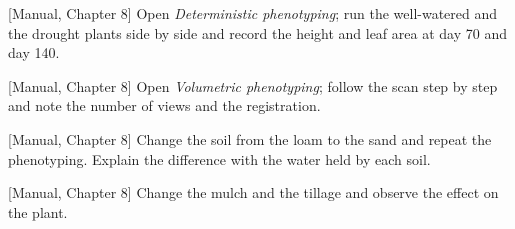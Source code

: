\begin{exlist}
\item {\color{khblue}[Manual, Chapter 8]} Open \emph{Deterministic phenotyping}; run the well-watered and the drought plants side by side and record the height and leaf area at day 70 and day 140.\par{}
\item {\color{khblue}[Manual, Chapter 8]} Open \emph{Volumetric phenotyping}; follow the scan step by step and note the number of views and the registration.\par{}
\item {\color{khblue}[Manual, Chapter 8]} Change the soil from the loam to the sand and repeat the phenotyping. Explain the difference with the water held by each soil.\par{}
\item {\color{khblue}[Manual, Chapter 8]} Change the mulch and the tillage and observe the effect on the plant.\par{}
\end{exlist}

